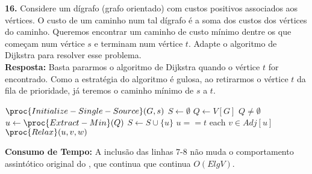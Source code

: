 
\noindent\textbf{16.} Considere um dígrafo (grafo orientado) com custos positivos associados aos vértices. O custo de um caminho num tal dígrafo é a soma dos custos dos vértices do caminho. Queremos encontrar um caminho de custo mínimo dentre os que começam num vértice $s$ e terminam num vértice $t$. Adapte o algoritmo de Dijkstra para resolver esse problema.\\[6pt]
\textbf{Resposta:} Basta pararmos o algoritmo de Dijkstra quando o vértice $t$ for encontrado. Como a estratégia do algoritmo é gulosa, ao retirarmos o vértice $t$ da fila de prioridade, já teremos o caminho mínimo de $s$ a $t$.

\begin{codebox}
\li $\proc{Initialize-Single-Source}(G, s)$
\li $S \gets \emptyset$
\li $Q \gets V[G]$
\li \While $Q \neq \emptyset$
\li \Do
        $u \gets \proc{Extract-Min}(Q)$
\li     $S \gets S \cup \{u\}$
\li     \If $u == t$
\li     \Then
            \Return
        \End
\li     \For each $v \in Adj[u]$
\li     \Do
            $\proc{Relax}(u, v, w)$
        \End
    \End
\end{codebox}

\textbf{Consumo de Tempo:} A inclusão das linhas 7-8 não muda o comportamento assintótico original do , que continua que continua $O(E lg V)$.\\[6pt]
